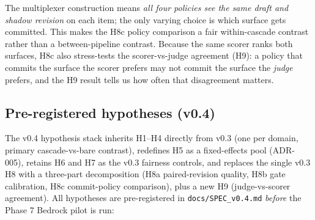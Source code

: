 The multiplexer construction means \emph{all four policies see the same draft and shadow revision} on each item; the only varying choice is which surface gets committed. This makes the H8c policy comparison a fair within-cascade contrast rather than a between-pipeline contrast. Because the same scorer ranks both surfaces, H8c also stress-tests the scorer-vs-judge agreement (H9): a policy that commits the surface the scorer prefers may not commit the surface the \emph{judge} prefers, and the H9 result tells us how often that disagreement matters.

\subsection{Pre-registered hypotheses (v0.4)}\label{sec:hypotheses}

The v0.4 hypothesis stack inherits H1--H4 directly from v0.3 (one per domain, primary cascade-vs-bare contrast), redefines H5 as a fixed-effects pool (ADR-005), retains H6 and H7 as the v0.3 fairness controls, and replaces the single v0.3 H8 with a three-part decomposition (H8a paired-revision quality, H8b gate calibration, H8c commit-policy comparison), plus a new H9 (judge-vs-scorer agreement). All hypotheses are pre-registered in \texttt{docs/SPEC\_v0.4.md} \emph{before} the Phase 7 Bedrock pilot is run:

